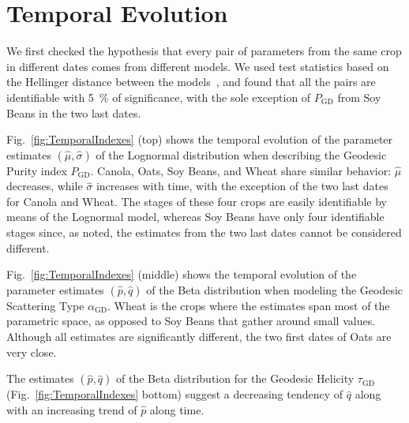 \documentclass[journal]{IEEEtran}
\begin{document}
\section{Temporal Evolution}

We first checked the hypothesis that every pair of parameters from the same crop in different dates comes from different models.
We used test statistics based on the Hellinger distance between the models~\cite{AnalyticExpressionsStochasticDistancesBetweenRelaxedComplexWishartDistributions}, and found that all the pairs are identifiable with \SI{5}{\percent} of significance, with the sole exception of $P_{\text{GD}}$ from Soy Beans in the two last dates.

Fig.~\ref{fig:TemporalIndexes} (top) shows the temporal evolution of the parameter estimates $(\widehat\mu,\widehat\sigma)$ of the Lognormal distribution when describing the Geodesic Purity index $P_{\text{GD}}$.
Canola, Oats, Soy Beans, and Wheat share similar behavior: $\widehat\mu$ decreases, while $\widehat\sigma$ increases with time, with the exception of the two last dates for Canola and Wheat.
The stages of these four crops are easily identifiable by means of the Lognormal model, whereas Soy Beans have only four identifiable stages since, as noted, the estimates from the two last dates cannot be considered different.

Fig.~\ref{fig:TemporalIndexes} (middle) shows the temporal evolution of the parameter estimates $(\widehat p, \widehat q)$ of the Beta distribution when modeling the Geodesic Scattering Type $\alpha_{\text{GD}}$.
Wheat is the crops where the estimates span most of the parametric space, as opposed to Soy Beans that gather around small values.
Although all estimates are significantly different, the two first dates of Oats are very close.

The estimates $(\widehat p, \widehat q)$ of the Beta distribution for the Geodesic Helicity $\tau_{\text{GD}}$ (Fig.~\ref{fig:TemporalIndexes} bottom) suggest a decreasing tendency of $\widehat q$ along with an increasing trend of $\widehat p$ along time.
\end{document}
